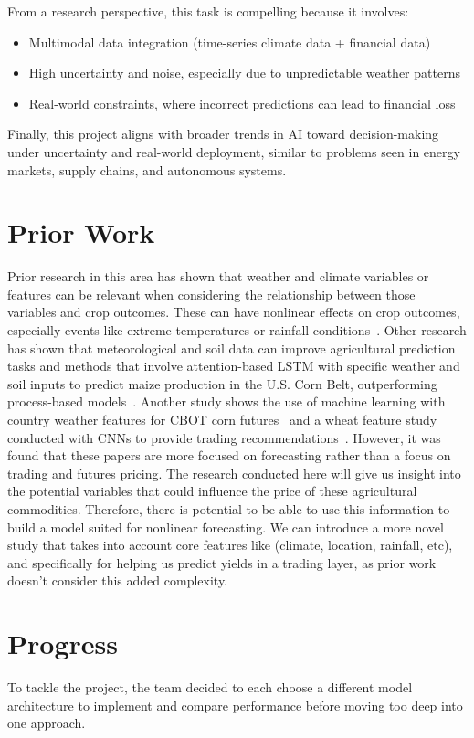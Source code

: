\documentclass{article} %
\begin{document}
From a research perspective, this task is compelling because it involves:
\begin{itemize}
   \item Multimodal data integration (time-series climate data + financial data)
   \item High uncertainty and noise, especially due to unpredictable weather patterns
   \item Real-world constraints, where incorrect predictions can lead to financial loss
\end{itemize}

Finally, this project aligns with broader trends in AI toward decision-making under uncertainty and real-world deployment, similar to problems seen in energy markets, supply chains, and autonomous systems.


\section{Prior Work}
Prior research in this area has shown that weather and climate variables or features can be relevant when considering the relationship between those variables and crop outcomes. These can have nonlinear effects on crop outcomes, especially events like extreme temperatures or rainfall conditions~\cite{schlenker2009nonlinear}. Other research has shown that meteorological and soil data can improve agricultural prediction tasks and methods that involve attention-based LSTM with specific weather and soil inputs to predict maize production in the U.S. Corn Belt, outperforming process-based models~\cite{liu2022machine}. Another study shows the use of machine learning with country weather features for CBOT corn futures~\cite{singh2022estimating} and a wheat feature study conducted with CNNs to provide trading recommendations~\cite{thaker2024forecasting}. However, it was found that these papers are more focused on forecasting rather than a focus on trading and futures pricing. The research conducted here will give us insight into the potential variables that could influence the price of these agricultural commodities. Therefore, there is potential to be able to use this information to build a model suited for nonlinear forecasting. We can introduce a more novel study that takes into account core features like (climate, location, rainfall, etc), and specifically for helping us predict yields in a trading layer, as prior work doesn't consider this added complexity.

\section{Progress}
To tackle the project, the team decided to each choose a different model architecture to implement and compare performance before moving too deep into one approach.
\end{document}
